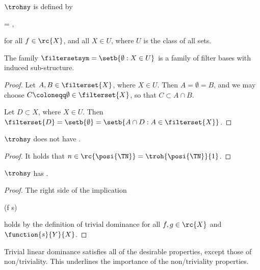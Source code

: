 \documentclass[b5paper, english, oneside]{memoir}
\begin{document}
\begin{definition}
 $\trohsy$ is defined by
\begin{eqs}
 = ,
\end{eqs}
for all $f \in \rc{X}$, and all $X \in U$, where $U$ is the class of all sets.
\end{definition}

\begin{theorem}
\label{TrivialLinearDominanceIsLocalLinearDominance}
The family $\filtersetsym = \setb{\emptyset : X \in U}$ is a family of filter bases with induced sub-structure.
\end{theorem}

\begin{proof}
Let $A, B \in \filterset{X}$, where $X \in U$. Then $A = \emptyset = B$, and we may choose $C \coloneqq \emptyset \in \filterset{X}$, so that $C \subset A \cap B$. 

Let $D \subset X$, where $X \in U$. Then $\filterset{D} = \setb{\emptyset} = \setb{A \cap D : A \in \filterset{X}}$.  	
\end{proof}

\begin{theorem}
\label{TrivialOneSeparationFails}
$\trohsy$ does not have .
\end{theorem}

\begin{proof}
It holds that $n \in \rc{\posi{\TN}} = \troh{\posi{\TN}}{1}$.
\end{proof}

\begin{theorem}
\label{TrivialSubComposability}
$\trohsy$ has .
\end{theorem}

\begin{proof}
The right side of the implication
\begin{eqs}
(f \circ s) \in {}
\end{eqs}
holds by the definition of trivial dominance for all $f, g \in \rc{X}$ and $\function{s}{Y}{X}$.
\end{proof}

\begin{note}
Trivial linear dominance satisfies all of the desirable properties, except those of non\-/triviality. This underlines the importance of the non\-/triviality properties.
\end{note}
\end{document}
